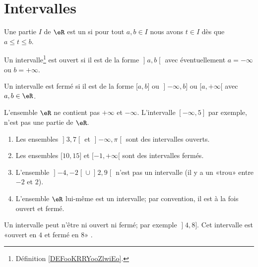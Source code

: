 
\section{Intervalles}

\begin{definition}[Intervalle]      \label{DEFooKRRYooZlwiEo}
	Une partie \( I\) de \( \eR\) est un  si pour tout \( a,b\in I\) nous avons \( t\in I\) dès que \( a\leq t\leq b\).
\end{definition}

\begin{proposition}     \label{PROPooJJRZooACUmWN}
	\begin{description}
		\item
		      Un intervalle\footnote{Définition \ref{DEFooKRRYooZlwiEo}.} est ouvert si il est de la forme \( \mathopen] a , b \mathclose[\) avec éventuellement \( a=-\infty\) ou \( b=+\infty\).
		\item
		      Un intervalle est fermé si il est de la forme \( \mathopen[ a , b \mathclose]\) ou \( \mathopen] -\infty , b \mathclose]\) ou \( \mathopen[ a , +\infty [\) avec \( a,b\in \eR\).
	\end{description}
\end{proposition}

\begin{remark}
	L'ensemble \( \eR\) ne contient pas \( +\infty\) et \( -\infty\). L'intervalle \( [-\infty, 5]\) par exemple, n'est pas une partie de \( \eR\).
\end{remark}

\begin{example}
	\begin{enumerate}
		\item
		      Les ensembles \( \mathopen] 3 , 7 \mathclose[\) et \( \mathopen] -\infty , \pi \mathclose[\) sont des intervalles ouverts.
		\item
		      Les ensembles \( \mathopen[ 10 , 15 \mathclose]\) et \( \mathopen[ -1 , +\infty [\) sont des intervalles fermés.
		\item
		      L'ensemble \( \mathopen] -4 , -2 \mathclose[\cup\mathopen] 2 , 9 \mathclose[\) n'est pas un intervalle (il y a un «trou» entre \(- 2\) et \( 2\)).
		\item
		      L'ensemble \( \eR\) lui-même est un intervalle; par convention, il est à la fois ouvert et fermé.
	\end{enumerate}
	Un intervalle peut n'être ni ouvert ni fermé; par exemple \( \mathopen] 4 , 8 \mathclose]\). Cet intervalle est «ouvert en \( 4\) et fermé en \( 8\)» .
\end{example}


